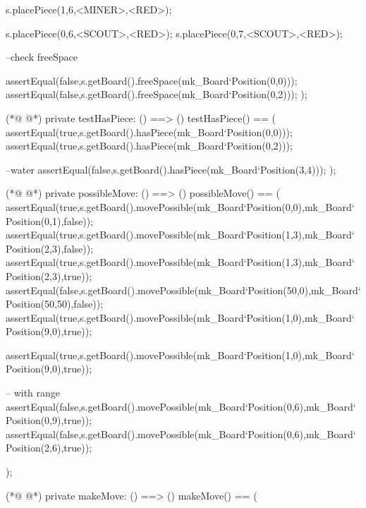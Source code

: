 \begin{vdmpp}[breaklines=true]
                    
                    s.placePiece(1,6,<MINER>,<RED>);
                    
                    
                    s.placePiece(0,6,<SCOUT>,<RED>);
                    s.placePiece(0,7,<SCOUT>,<RED>);
             
                   --check freeSpace
                   
                        assertEqual(false,s.getBoard().freeSpace(mk_Board`Position(0,0)));
                        assertEqual(false,s.getBoard().freeSpace(mk_Board`Position(0,2)));
                );
                
(*@
\label{testHasPiece:64}
@*)
                private testHasPiece: () ==> ()
                testHasPiece() ==
                (
                 assertEqual(true,s.getBoard().hasPiece(mk_Board`Position(0,0)));
                 assertEqual(true,s.getBoard().hasPiece(mk_Board`Position(0,2)));
                 
                 --water
                 assertEqual(false,s.getBoard().hasPiece(mk_Board`Position(3,4)));
                );
                
(*@
\label{possibleMove:74}
@*)
                  private possibleMove: () ==> ()
                possibleMove() ==
                (
                  assertEqual(true,s.getBoard().movePossible(mk_Board`Position(0,0),mk_Board`Position(0,1),false));
                  assertEqual(true,s.getBoard().movePossible(mk_Board`Position(1,3),mk_Board`Position(2,3),false));
                  assertEqual(true,s.getBoard().movePossible(mk_Board`Position(1,3),mk_Board`Position(2,3),true));
                  assertEqual(false,s.getBoard().movePossible(mk_Board`Position(50,0),mk_Board`Position(50,50),false));
                  assertEqual(true,s.getBoard().movePossible(mk_Board`Position(1,0),mk_Board`Position(9,0),true));
                  
                  assertEqual(true,s.getBoard().movePossible(mk_Board`Position(1,0),mk_Board`Position(9,0),true));
                  
                    -- with range
                    assertEqual(false,s.getBoard().movePossible(mk_Board`Position(0,6),mk_Board`Position(0,9),true));
                    assertEqual(false,s.getBoard().movePossible(mk_Board`Position(0,6),mk_Board`Position(2,6),true));
                    
                );
                
(*@
\label{makeMove:91}
@*)
                private makeMove: () ==> ()
                 makeMove() ==
                (
                  

\end{vdmpp}
